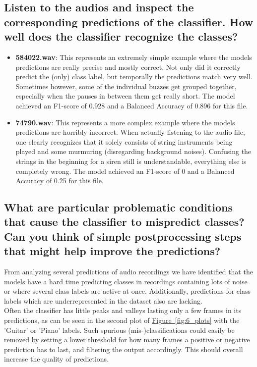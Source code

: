 \subsection{Listen to the audios and inspect the corresponding predictions of the classifier. How well does the classifier recognize the classes?}
\label{sec:Analysing Predictions:b}
\begin{itemize}
    \item \textbf{584022.wav}: This represents an extremely simple example where the models predictions are really precise and mostly correct. Not only did it correctly predict the (only) class label, but temporally the predictions match very well. Sometimes however, some of the individual buzzes get grouped together, especially when the pauses in between them get really short. The model achieved an F1-score of 0.928 and a Balanced Accuracy of 0.896 for this file.
    \item \textbf{74790.wav}: This represents a more complex example where the models predictions are horribly incorrect. When actually listening to the audio file, one clearly recognizes that it solely consists of string instruments being played and some murmuring (disregarding background noises). Confusing the strings in the beginning for a siren still is understandable, everything else is completely wrong. The model achieved an F1-score of 0 and a Balanced Accuracy of 0.25 for this file.
\end{itemize}


\subsection{What are particular problematic conditions that cause the classifier to mispredict classes? Can you think of simple postprocessing steps that might help improve the predictions?}
\label{sec:Analysing Predictions:c}

From analyzing several predictions of audio recordings we have identified that the models have a hard time predicting classes in recordings containing lots of noise or where several class labels are active at once. Additionally, predictions for class labels which are underrepresented in the dataset also are lacking. \\
Often the classifier has little peaks and valleys lasting only a few frames in its predictions, as can be seen in the second plot of \hyperref[fig:6_plots]{Figure~\ref*{fig:6_plots}} with the 'Guitar' or 'Piano' labels. Such spurious (mis-)classifications could easily be removed by setting a lower threshold for how many frames a positive or negative prediction has to last, and filtering the output accordingly. This should overall increase the quality of predictions.





